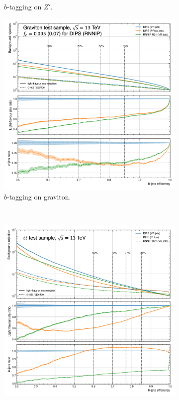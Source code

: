 \begin{figure}
\begin{subfigure}[t]{0.32\textwidth}
      \caption{$b$-tagging on $Z'$.}
      \label{fig:dipsVRROCzp}
    \end{subfigure}
    \hfill
    \begin{subfigure}[t]{0.32\textwidth}
      \centering
      \includegraphics[width=\textwidth]{Images/FTAG/VRDips/ROC/grb.png}
      \caption{$b$-tagging on graviton.}
      \label{fig:dipsVRROCgr}
    \end{subfigure} \\
    \begin{subfigure}[t]{0.32\textwidth}
      \centering
      \includegraphics[width=\textwidth]{Images/FTAG/VRDips/ROC/ttc.png}

\end{subfigure}
\end{figure}
